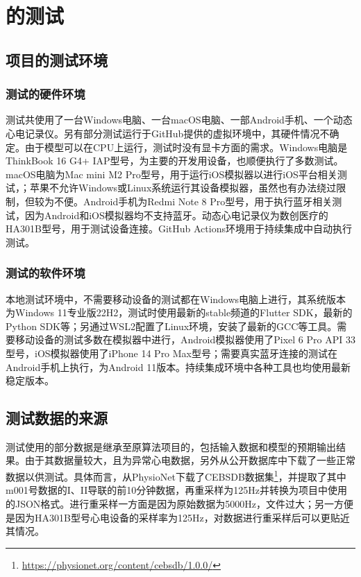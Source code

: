 \chapter{\app 的测试}\label{ch:test}


\section{项目的测试环境}\label{sec:test-env}

\subsection{测试的硬件环境}\label{subsec:test-hardware}

测试共使用了一台Windows电脑、一台macOS电脑、一部Android手机、一个动态心电记录仪。另有部分测试运行于GitHub提供的虚拟环境中，其硬件情况不确定。由于模型可以在CPU上运行，测试时没有显卡方面的需求。Windows电脑是ThinkBook 16 G4+ IAP型号，为主要的开发用设备，也顺便执行了多数测试。macOS电脑为Mac mini M2 Pro型号，用于运行iOS模拟器以进行iOS平台相关测试，；苹果不允许Windows或Linux系统运行其设备模拟器，虽然也有办法绕过限制，但较为不便。Android手机为Redmi Note 8 Pro型号，用于执行蓝牙相关测试，因为Android和iOS模拟器均不支持蓝牙。动态心电记录仪为数创医疗的HA301B型号，用于测试设备连接。GitHub Actions环境用于持续集成中自动执行测试。

\subsection{测试的软件环境}\label{subsec:test-software}

本地测试环境中，不需要移动设备的测试都在Windows电脑上进行，其系统版本为Windows 11专业版22H2，测试时使用最新的stable频道的Flutter SDK，最新的Python SDK等；另通过WSL2配置了Linux环境，安装了最新的GCC等工具。需要移动设备的测试多数在模拟器中进行，Android模拟器使用了Pixel 6 Pro API 33型号，iOS模拟器使用了iPhone 14 Pro Max型号；需要真实蓝牙连接的测试在Android手机上执行，为Android 11版本。持续集成环境中各种工具也均使用最新稳定版本。


\section{测试数据的来源}\label{sec:test-data}

测试使用的部分数据是继承至原算法项目的，包括输入数据和模型的预期输出结果。由于其数据量较大，且为异常心电数据，另外从公开数据库中下载了一些正常数据以供测试。具体而言，从PhysioNet下载了CEBSDB数据集\footnote{\url{https://physionet.org/content/cebsdb/1.0.0/}}，并提取了其中m001号数据的I、II导联的前10分钟数据，再重采样为125Hz并转换为项目中使用的JSON格式。进行重采样一方面是因为原始数据为5000Hz，文件过大；另一方便是因为HA301B型号心电设备的采样率为125Hz，对数据进行重采样后可以更贴近其情况。


